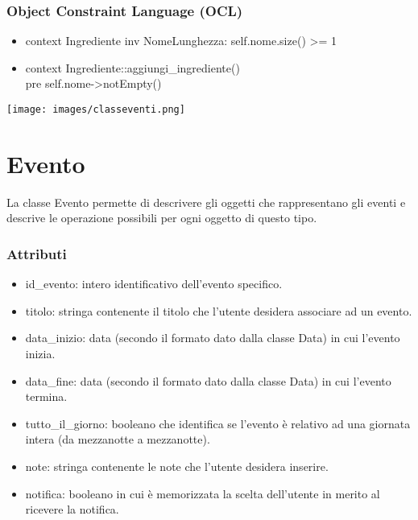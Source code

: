 \documentclass[a4paper,12pt]{article}
\begin{document}
\subsubsection*{Object Constraint Language (OCL)}
\begin{itemize}
\item {\ttfamily context Ingrediente inv NomeLunghezza: self.nome.size() >= 1}
\item {\ttfamily context Ingrediente::aggiungi\_ingrediente() \\pre self.nome->notEmpty()}

\end{itemize}
\newpage


\begin{center}
  \texttt{[image: images/classeventi.png]}
\end{center}
\section{Evento}
La classe {\sffamily Evento} permette di descrivere gli oggetti che rappresentano gli eventi e descrive le operazione possibili per ogni oggetto di questo tipo.
\subsubsection*{Attributi}
\begin{itemize} \setlength\itemsep{0.01em}
\item {\ttfamily id\_evento}: intero identificativo dell'evento specifico.
\item {\ttfamily titolo}: stringa contenente il titolo che l'utente desidera associare ad un evento.
\item {\ttfamily data\_inizio}: data (secondo il formato dato dalla classe {\sffamily Data}) in cui l'evento inizia.
\item {\ttfamily data\_fine}: data (secondo il formato dato dalla classe {\sffamily Data}) in cui l'evento termina.
\item {\ttfamily tutto\_il\_giorno}: booleano che identifica se l'evento è relativo ad una giornata intera (da mezzanotte a mezzanotte).
\item {\ttfamily note}: stringa contenente le note che l'utente desidera inserire.
\item {\ttfamily notifica}: booleano in cui è memorizzata la scelta dell'utente in merito al ricevere la notifica.
\end{itemize}
\end{document}
